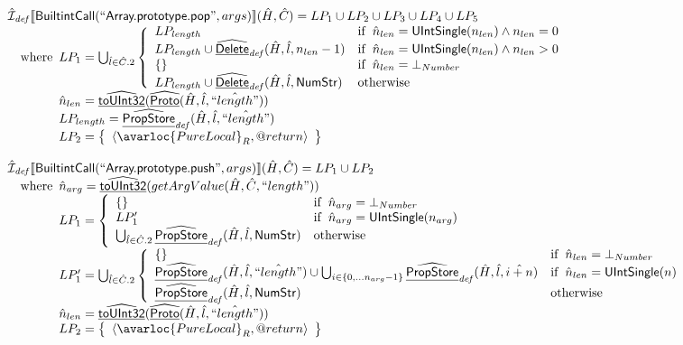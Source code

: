 \[
\begin{array}{l}


\aI_{\it def}\lbr \SF{BuiltintCall}(``\SF{Array.prototype.pop}",args)\rbr(\hat{H},\hat{C}) = LP_1 \cup LP_2 \cup LP_3 \cup LP_4 \cup LP_5\\
\quad\wherec{
  LP_1 = \bigcup_{\hat{l} \in \hat{C}.2}  \left\{\begin{array}{ll}
      LP_{length} & \ifc{\hat{n}_{len} = \SF{UIntSingle}(n_{len}) \land n_{len} = 0}\\
      LP_{length} \cup \ahf{Delete}_{\it def}(\hat{H}, \hat{l}, n_{len}-1) & \ifc{\hat{n}_{len} = \SF{UIntSingle}(n_{len}) \land n_{len} > 0}\\
      \set{} & \ifc{\hat{n}_{len} = \bot_{Number}}\\
      LP_{length} \cup \ahf{Delete}_{\it def}(\hat{H}, \hat{l}, \SF{NumStr}) & \owc
    \end{array}\right.\\
  \hat{n}_{len} = \ahf{toUInt32}(\ahf{Proto}(\hat{H}, \hat{l}, \hat{``length"}))\\
  LP_{length} = \ahf{PropStore}_{\it def}(\hat{H}, \hat{l}, \hat{``length"})\\
  LP_2 = \set{\langle\avarloc{PureLocal}_R,\varprop{return}\rangle}\\
  }\\
\\

\aI_{\it def}\lbr \SF{BuiltintCall}(``\SF{Array.prototype.push}",args)\rbr(\hat{H},\hat{C}) = LP_1 \cup LP_2\\
\quad\wherec{
  \hat{n}_{arg} = \ahf{toUInt32}(getArgValue(\hat{H},\hat{C}, ``length"))\\
  LP_1 =  \left\{\begin{array}{ll}
      \set{} & \ifc{\hat{n}_{arg} = \bot_{Number}}\\
      LP_1' & \ifc{\hat{n}_{arg} = \SF{UIntSingle}(n_{arg})}\\
      \bigcup_{\hat{l} \in \hat{C}.2} \ahf{PropStore}_{\it def}(\hat{H}, \hat{l}, \SF{NumStr}) & \owc
    \end{array}\right.\\
  LP_1' = \bigcup_{\hat{l} \in \hat{C}.2}  \left\{\begin{array}{ll}
      \set{} & \ifc{\hat{n}_{len} = \bot_{Number}}\\
      \ahf{PropStore}_{\it def}(\hat{H}, \hat{l}, \hat{``length"}) \cup \bigcup_{i \in \{0,...n_{arg}-1\}}\ahf{PropStore}_{\it def}(\hat{H}, \hat{l}, \hat{i+n}) & \ifc{\hat{n}_{len} = \SF{UIntSingle}(n)}\\
      \ahf{PropStore}_{\it def}(\hat{H}, \hat{l}, \SF{NumStr}) & \owc
    \end{array}\right.\\
  \hat{n}_{len} = \ahf{toUInt32}(\ahf{Proto}(\hat{H}, \hat{l}, \hat{``length"}))\\
  LP_2 = \set{\langle\avarloc{PureLocal}_R,\varprop{return}\rangle}\\
  }\\
\\




\end{array}\]
